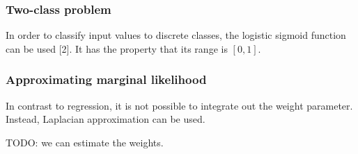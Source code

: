 \subsubsection{Two-class problem}
In order to classify input values to discrete classes, the logistic sigmoid function can be used [2]. It has the property that its range is $[0,1]$.

\subsubsection{Approximating marginal likelihood}
In contrast to regression, it is not possible to integrate out the weight parameter. Instead, Laplacian approximation can be used.


TODO: we can estimate the weights.


